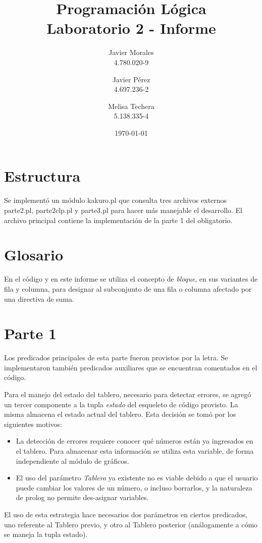\documentclass[]{article}
\title{Programación Lógica \\ Laboratorio 2 - Informe}
\author{
	Javier Morales\\
	4.780.020-9\\
	\and
	Javier Pérez\\
	4.697.236-2
	\and
	Melisa Techera\\
	5.138.335-4
}
\date{\today}
\begin{document}
\maketitle

\section{Estructura}

Se implementó un módulo kakuro.pl que consulta tres archivos externos parte2.pl, parte2clp.pl y parte3.pl para hacer más manejable el desarrollo. El archivo principal contiene la implementación de la parte 1 del obligatorio.

\section{Glosario}

En el código y en este informe se utiliza el concepto de \emph{bloque}, en sus variantes de fila y columna, para designar al subconjunto de una fila o columna afectado por una directiva de suma.

\section{Parte 1}

Los predicados principales de esta parte fueron provistos por la letra. Se implementaron también predicados auxiliares que se encuentran comentados en el código.

Para el manejo del estado del tablero, necesario para detectar errores, se agregó un tercer componente a la tupla \emph{estado} del esqueleto de código provisto. La misma almacena el estado actual del tablero. Esta decisión se tomó por los siguientes motivos:
\begin{itemize}
	\item{La detección de errores requiere conocer qué números están ya ingresados en el tablero. Para almacenar esta información se utiliza esta variable, de forma independiente al módulo de gráficos.}
	\item{El uso del parámetro \emph{Tablero} ya existente no es viable debido a que el usuario puede cambiar los valores de un número, o incluso borrarlos, y la naturaleza de prolog no permite des-asignar variables.}
\end{itemize}

El uso de esta estrategia hace necesarios dos parámetros en ciertos predicados, uno referente al Tablero previo, y otro al Tablero posterior (análogamente a cómo se maneja la tupla estado).
\end{document}
